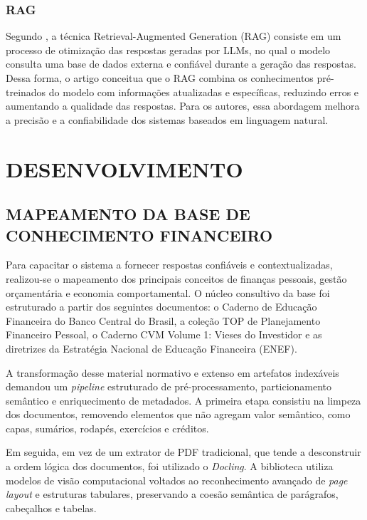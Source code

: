 \documentclass[12pt]{article}
\begin{document}
    \subsubsection{RAG}

      Segundo \cite{gao2024retrieval}, a técnica Retrieval-Augmented Generation (RAG) consiste em um processo de otimização das respostas geradas por LLMs, no qual o modelo consulta uma base de dados externa e confiável durante a geração das respostas. Dessa forma, o artigo conceitua que o RAG combina os conhecimentos pré-treinados do modelo com informações atualizadas e específicas, reduzindo erros e aumentando a qualidade das respostas. Para os autores, essa abordagem melhora a precisão e a confiabilidade dos sistemas baseados em linguagem natural.

\section{DESENVOLVIMENTO}

  \subsection{MAPEAMENTO DA BASE DE CONHECIMENTO FINANCEIRO}

    Para capacitar o sistema a fornecer respostas confiáveis e contextualizadas, realizou-se o mapeamento dos principais conceitos de finanças pessoais, gestão orçamentária e economia comportamental. O núcleo consultivo da base foi estruturado a partir dos seguintes documentos: o Caderno de Educação Financeira do Banco Central do Brasil, a coleção TOP de Planejamento Financeiro Pessoal, o Caderno CVM Volume 1: Vieses do Investidor e as diretrizes da Estratégia Nacional de Educação Financeira (ENEF).

    A transformação desse material normativo e extenso em artefatos indexáveis demandou um \textit{pipeline} estruturado de pré-processamento, particionamento semântico e enriquecimento de metadados. A primeira etapa consistiu na limpeza dos documentos, removendo elementos que não agregam valor semântico, como capas, sumários, rodapés, exercícios e créditos.

    Em seguida, em vez de um extrator de PDF tradicional, que tende a desconstruir a ordem lógica dos documentos, foi utilizado o \textit{Docling}. A biblioteca utiliza modelos de visão computacional voltados ao reconhecimento avançado de \textit{page layout} e estruturas tabulares, preservando a coesão semântica de parágrafos, cabeçalhos e tabelas.
\end{document}
